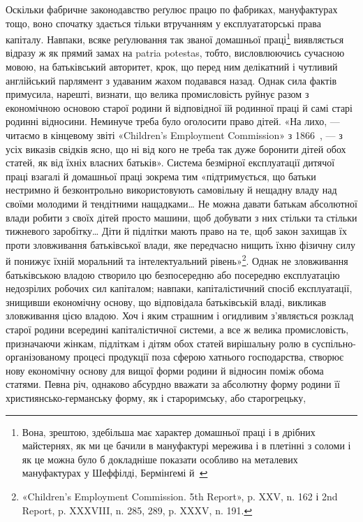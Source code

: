Оскільки фабричне законодавство реґулює працю по фабриках,
мануфактурах тощо, воно спочатку здається тільки втручанням
у експлуататорські права капіталу. Навпаки, всяке реґулювання
так званої домашньої праці\footnote{
Вона, зрештою, здебільша має характер домашньої праці і в
дрібних майстернях, як ми це бачили в мануфактурі мережива і в плетінні
з соломи і як це можна було б докладніше показати особливо на металевих
мануфактурах у Шеффілді, Бермінґемі й~
} виявляється відразу ж
як прямий замах на patria potestas, тобто, висловлюючись сучасною
мовою, на батьківський авторитет, крок, що перед ним делікатний
і чутливий англійський парлямент з удаваним жахом
подавався назад. Однак сила фактів примусила, нарешті, визнати,
що велика промисловість руйнує разом з економічною основою
старої родини й відповідної їй родинної праці й самі старі родинні
відносини. Неминуче треба було оголосити право дітей. «На лихо,
— читаємо в кінцевому звіті «Children’s Employment Commission»
з 1866~, — з усіх виказів свідків ясно, що ні від кого
не треба так дуже боронити дітей обох статей, як від їхніх власних
батьків». Система безмірної експлуатації дитячої праці взагалі
й домашньої праці зокрема тим «підтримується, що батьки нестримно
й безконтрольно використовують самовільну й нещадну
владу над своїми молодими й тендітними нащадками\dots{} Не можна
давати батькам абсолютної влади робити з своїх дітей просто
машини, щоб добувати з них стільки та стільки тижневого заробітку\dots{}
Діти й підлітки мають право на те, щоб закон захищав їх
проти зловживання батьківської влади, яке передчасно нищить
їхню фізичну силу й понижує їхній моральний та інтелектуальний
рівень»\footnote{
«Children’s Employment Commission. 5th Report», p. XXV,
n. 162 і 2nd Report, p. XXXVIII, n. 285, 289, p. XXXV, n. 191.
}. Однак не зловживання батьківською владою
створило цю безпосередню або посередню експлуатацію недозрілих
робочих сил капіталом; навпаки, капіталістичний спосіб
експлуатації, знищивши економічну основу, що відповідала батьківській
владі, викликав зловживання цією владою. Хоч і яким
страшним і огидливим з’являється розклад старої родини всередині
капіталістичної системи, а все ж велика промисловість,
призначаючи жінкам, підліткам і дітям обох статей вирішальну
ролю в суспільно-організованому процесі продукції поза сферою
хатнього господарства, створює нову економічну основу для
вищої форми родини й відносин поміж обома статями. Певна
річ, однаково абсурдно вважати за абсолютну форму родини її
християнсько-германську форму, як і староримську, або старогрецьку,
